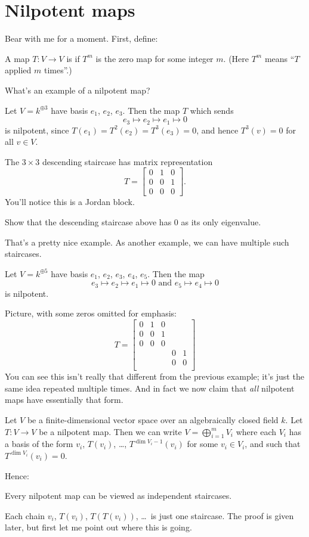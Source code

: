 \section{Nilpotent maps}
Bear with me for a moment.  First, define:
\begin{definition}
	A map $T \colon V \to V$ is  if $T^m$ is the zero map for some integer $m$.
	(Here $T^m$ means ``$T$ applied $m$ times''.)
\end{definition}
What's an example of a nilpotent map?
\begin{example}
        Let $V = k^{\oplus 3}$ have basis $e_1$, $e_2$, $e_3$.
	Then the map $T$ which sends
	\[ e_3 \mapsto e_2 \mapsto e_1 \mapsto 0 \]
	is nilpotent, since $T(e_1) = T^2(e_2) = T^3(e_3) = 0$,
	and hence $T^3(v) = 0$ for all $v \in V$.
\end{example}
The $3 \times 3$ descending staircase has matrix representation
\[ T = \begin{bmatrix}
		0 & 1 & 0 \\
		0 & 0 & 1 \\
		0 & 0 & 0
	\end{bmatrix}. \]
You'll notice this is a Jordan block.
\begin{exercise}
	Show that the descending staircase above
	has $0$ as its only eigenvalue.
\end{exercise}

That's a pretty nice example.
As another example, we can have multiple such staircases.
\begin{example}
	Let $V = k^{\oplus 5}$ have basis $e_1$, $e_2$, $e_3$, $e_4$, $e_5$.
	Then the map
	\[ e_3 \mapsto e_2 \mapsto e_1 \mapsto 0 \text{ and }
		e_5 \mapsto e_4 \mapsto 0 \]
	is nilpotent.
\end{example}
Picture, with some zeros omitted for emphasis:
\[ T = \begin{bmatrix}
		0 & 1 & 0 &   &   \\
		0 & 0 & 1 &   &   \\
		0 & 0 & 0 &   &   \\
		  &   &   & 0 & 1 \\
		  &   &   & 0 & 0 \\
	\end{bmatrix}
\]
You can see this isn't really that different
from the previous example;
it's just the same idea repeated multiple times.
And in fact we now claim that \emph{all}
nilpotent maps have essentially that form.
\begin{theorem}
	Let $V$ be a finite-dimensional vector space
	over an algebraically closed field $k$.
	Let $T \colon V \to V$ be a nilpotent map.
	Then we can write $V = \bigoplus_{i=1}^m V_i$
	where each $V_i$ has a basis of the form
	$v_i$, $T(v_i)$, \dots, $T^{\dim V_i - 1}(v_i)$
  for some $v_i \in V_i$, and such that $T^{\dim V_i}(v_i) = 0$.
\end{theorem}
Hence:
\begin{moral}
	Every nilpotent map can be viewed as independent staircases.
\end{moral}
Each chain $v_i$, $T(v_i)$, $T(T(v_i))$, \dots\ is just one staircase.
The proof is given later, but first let me point out where this is going.

